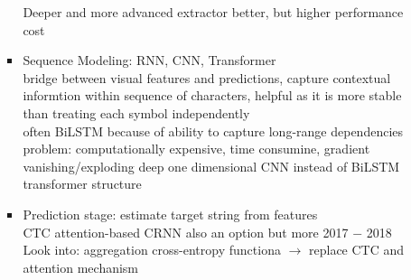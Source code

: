 \begin{itemize}
\begin{itemize}
\begin{itemize}
                        Deeper and more advanced extractor better, but higher performance cost
                    \item Sequence Modeling: RNN, CNN, Transformer \\
                        bridge between visual features and predictions, capture contextual informtion
                        within sequence of characters, helpful as it is more stable than treating each
                        symbol independently\\
                        often BiLSTM because of ability to capture long-range dependencies
                        problem: computationally expensive, time consumine, gradient vanishing/exploding
                        deep one dimensional CNN instead of BiLSTM\\
                        transformer structure
                    \item Prediction stage: estimate target string from features\\
                        CTC
                        attention-based
                        CRNN also an option but more 2017 $-$ 2018
                        Look into: aggregation cross-entropy functiona
                            $\rightarrow$ replace CTC and attention mechanism
                \end{itemize}
        \end{itemize}
\end{itemize}

